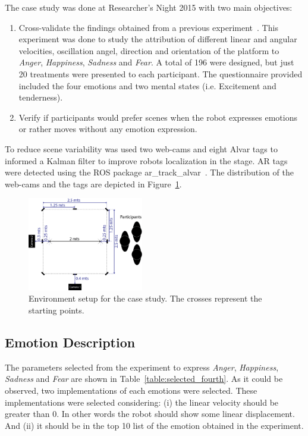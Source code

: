 The case study was done at Researcher's Night 2015 with two main objectives:
\begin{enumerate}
	\item Cross-validate the findings obtained from a previous experiment~\cite{Angel2017-2}. This experiment was done to study the attribution of different linear and angular velocities, oscillation angel, direction and orientation of the platform to \textit{Anger}, \textit{Happiness}, \textit{Sadness} and \textit{Fear}. A total of 196 were designed, but just 20 treatments were presented to each participant. The questionnaire provided included the four emotions and two mental states (i.e. Excitement and tenderness).
	\item Verify if participants would prefer scenes when the robot expresses emotions or rather moves without any emotion expression. 
\end{enumerate}
To reduce scene variability was used two web-cams and eight Alvar tags to informed a Kalman filter to improve robots localization in the stage. AR tags were detected using the ROS package ar\_track\_alvar~\cite{artag2015}. The distribution of the web-cams and the tags are depicted in Figure~\ref{fig:setup_fourth}. 

\begin{figure}
	\centering
	\includegraphics[width=0.45\textwidth]{./Images/FourthCase.png} 
	\caption{Environment setup for the case study. The crosses represent the starting points.}
	\label{fig:setup_fourth}
\end{figure}

\subsection{Emotion Description}

The parameters selected from the experiment to express \textit{Anger}, \textit{Happiness}, \textit{Sadness} and \textit{Fear} are shown in Table~\ref{table:selected_fourth}. As it could be observed, two implementations of each emotions were selected. These implementations were selected considering: (i) the linear velocity should be greater than $0$. In other words the robot should show some linear displacement. And (ii) it should be in the top 10 list of the emotion obtained in the experiment.

